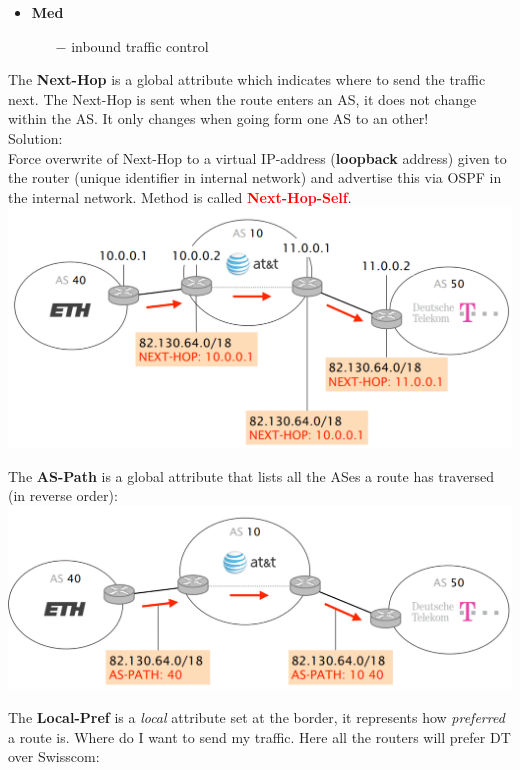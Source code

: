 \documentclass[a4paper, fontsize=8pt, landscape, DIV=1]{scrartcl}
\begin{document}
\begin{multicols*}{4}
\begin{itemize}[noitemsep]
\begin{itemize}
			\end{itemize}
			\item \textbf{Med}
			\begin{itemize}
				\item[$-$] inbound traffic control
			\end{itemize}
		\end{itemize}
		The \textbf{Next-Hop} is a global attribute which indicates where to send the traffic next. The Next-Hop is sent when the route enters an AS, it does not change within the AS. It only changes when going form one AS to an other!\\
		Solution:\\
		Force overwrite of Next-Hop to a virtual IP-address (\textbf{loopback} address) given to the router (unique identifier in internal network) and advertise this via OSPF in the internal network. Method is called \textcolor{Red}{\textbf{Next-Hop-Self}}.
		\includegraphics[width=\columnwidth]{images/Network_Layer/next_hop.png}
		\par 
		The \textbf{AS-Path} is a global attribute that lists all the ASes a route has traversed (in reverse order):\\
		\includegraphics[width=\columnwidth]{images/Network_Layer/as_path.png}
		\par 
		The \textbf{Local-Pref} is a \textit{local} attribute set at the border, it represents how \textit{preferred} a route is. Where do I want to send my traffic. Here all the routers will prefer DT over Swisscom:\\

\end{multicols*}
\end{document}
